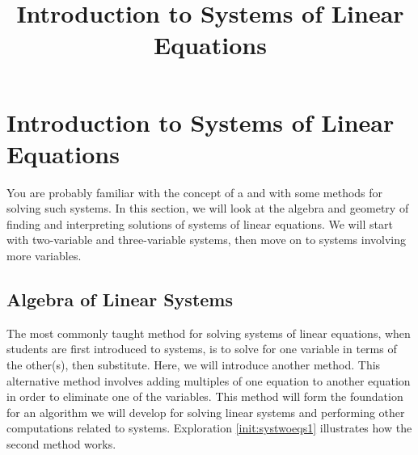 \documentclass{ximera}
\title{Introduction to Systems of Linear Equations} \license{CC BY-NC-SA 4.0}
\begin{document}
\begin{abstract}
\end{abstract}
\maketitle
\section*{Introduction to Systems of Linear Equations}

You are probably familiar with the concept of a  and with some methods for solving such systems.  In this section, we will look at the algebra and geometry of finding and interpreting solutions of systems of linear equations.  We will start with two-variable and three-variable systems, then move on to systems involving more variables.  

\subsection*{Algebra of Linear Systems}
The most commonly taught method for solving systems of linear equations, when students are first introduced to systems, is to solve for one variable in terms of the other(s), then substitute.  Here, we will introduce another method.  This alternative method involves adding multiples of one equation to another equation in order to eliminate one of the variables.  This method will form the foundation for an algorithm we will develop for solving linear systems and performing other computations related to systems.  Exploration \ref{init:systwoeqs1} illustrates how the second method works.
\end{document}
